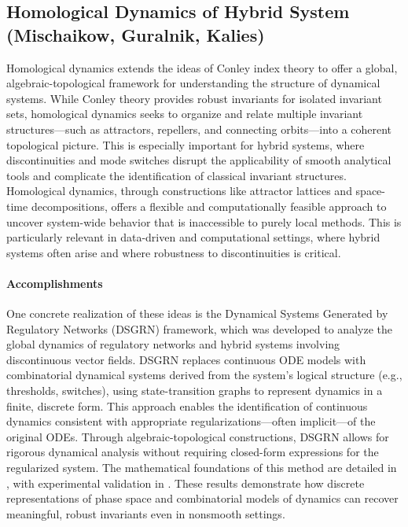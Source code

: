 \documentclass[letterpaper,11pt]{article}
\begin{document}

\subsection{Homological Dynamics of Hybrid System (Mischaikow, Guralnik, Kalies)}
\label{sec:homologicaldynamicsHS}

Homological dynamics extends the ideas of Conley index theory to offer a global, algebraic-topological framework for understanding the structure of dynamical systems.
While Conley theory provides robust invariants for isolated invariant sets, homological dynamics seeks to organize and relate multiple invariant structures—such as attractors, repellers, and connecting orbits—into a coherent topological picture.
This is especially important for hybrid systems, where discontinuities and mode switches disrupt the applicability of smooth analytical tools and complicate the identification of classical invariant structures.
Homological dynamics, through constructions like attractor lattices and space-time decompositions, offers a flexible and computationally feasible approach to uncover system-wide behavior that is inaccessible to purely local methods.
This is particularly relevant in data-driven and computational settings, where hybrid systems often arise and where robustness to discontinuities is critical.

\paragraph{Accomplishments}

One concrete realization of these ideas is the Dynamical Systems Generated by Regulatory Networks (DSGRN) framework, which was developed to analyze the global dynamics of regulatory networks and hybrid systems involving discontinuous vector fields.
DSGRN replaces continuous ODE models with combinatorial dynamical systems derived from the system’s logical structure (e.g., thresholds, switches), using state-transition graphs to represent dynamics in a finite, discrete form.
This approach enables the identification of continuous dynamics consistent with appropriate regularizations—often implicit—of the original ODEs.
Through algebraic-topological constructions, DSGRN allows for rigorous dynamical analysis without requiring closed-form expressions for the regularized system.
The mathematical foundations of this method are detailed in \cite{gameiro2024globaldynamicsordinarydifferential}, with experimental validation in \cite{kepley2024globalanalysisregulatorynetwork}.
These results demonstrate how discrete representations of phase space and combinatorial models of dynamics can recover meaningful, robust invariants even in nonsmooth settings.
\end{document}
